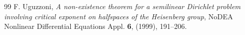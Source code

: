 \documentclass[11pt]{amsart}
\numberwithin{equation}{section} %
\theoremstyle{definition}
\begin{document}
\begin{thebibliography}{99}
	F. Uguzzoni, 
	{\em A non-existence theorem for a semilinear Dirichlet problem involving critical exponent on halfspaces of the Heisenberg group}, 
	NoDEA Nonlinear Differential Equations Appl. {\bf 6}, (1999), 191--206.
	
	
	
	
	
\end{thebibliography}


 
\end{document}
